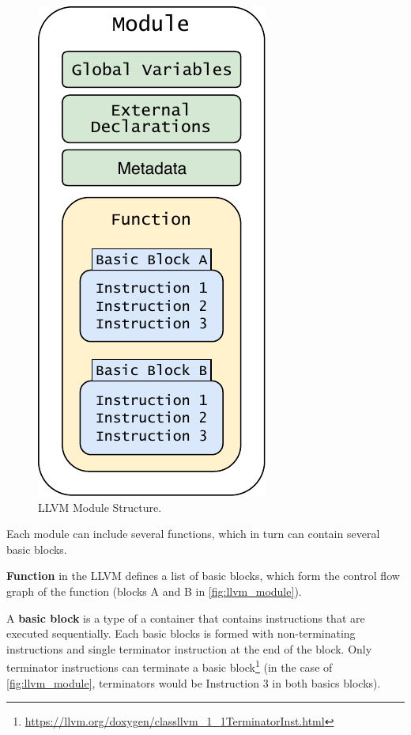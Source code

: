\documentclass[12pt, twoside]{fithesis2}
\renewcommand{\_}{\leavevmode \kern0.07em\vbox{\hrule width0.4em}}
\begin{document}
\begin{figure}[ht]
    \centering
    \includegraphics[]{images/llvm/llvm_module.pdf}
    \caption{LLVM Module Structure.}
    \label{fig:llvm_module}
\end{figure}

Each module can include several functions, which in turn can contain several
basic blocks.

\textbf{Function} in the LLVM defines a list of basic blocks, which form the
control flow graph of the function (blocks A and B in \autoref{fig:llvm_module}).
\cite{llvm-ir}

A \textbf{basic block} is a type of a container that contains instructions that
are executed sequentially.\cite{llvm-bb} Each basic blocks is formed with
non-terminating instructions and single terminator instruction at the end of
the block. Only terminator instructions can terminate a basic block\footnote{
\url{https://llvm.org/doxygen/classllvm_1_1TerminatorInst.html}
}
(in the case of \autoref{fig:llvm_module}, terminators would be Instruction 3
in both basics blocks).
\end{document}
